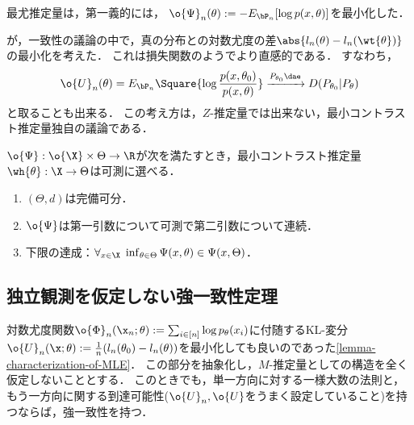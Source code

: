 \documentclass[uplatex,dvipdfmx]{jsreport}
\begin{document}
\begin{example}[最尤推定]
    最尤推定量は，第一義的には，
    $\o{\Psi}_n(\theta):=-E_{\bP_n} [\log p(x,\theta)]$を最小化した．
    
    が，一致性の議論の中で，真の分布との対数尤度の差$\abs{l_n(\theta)-l_n(\wt{\theta})}$の最小化を考えた．
    これは損失関数のようでより直感的である．
    すなわち，
    \[\o{U}_n(\theta)=E_{\bP_n} \Square{\log\frac{ p(x,\theta_0)}{p(x,\theta)}}\xrightarrow{P_{\theta_0}\dae}D(P_{\theta_0}|P_\theta)\]
    と取ることも出来る．
    この考え方は，$Z$-推定量では出来ない，最小コントラスト推定量独自の議論である．
\end{example}

\begin{theorem}\label{thm-measurable-selection}
    $\o{\Psi}:\o{\X}\times\Theta\to\R$が次を満たすとき，最小コントラスト推定量$\wh{\theta}:\X\to\Theta$は可測に選べる．
    \begin{enumerate}
        \item $(\Theta,d)$は完備可分．
        \item $\o{\Psi}$は第一引数について可測で第二引数について連続．
        \item 下限の達成：$\forall_{x\in\X}\;\inf_{\theta\in\Theta}\Psi(x,\theta)\in\Psi(x,\Theta)$．
    \end{enumerate}
\end{theorem}

\subsection{独立観測を仮定しない強一致性定理}

\begin{tcolorbox}[colframe=ForestGreen, colback=ForestGreen!10!white,breakable,colbacktitle=ForestGreen!40!white,coltitle=black,fonttitle=\bfseries\sffamily,
title=]
    対数尤度関数$\o{\Phi}_n(\x_n;\theta):=\sum_{i\in[n]}\log p_\theta(x_i)$に付随するKL-変分$\o{U}_n(\x;\theta):=\frac{1}{n}(l_n(\theta_0)-l_n(\theta))$を最小化しても良いのであった\ref{lemma-characterization-of-MLE}．
    この部分を抽象化し，$M$-推定量としての構造を全く仮定しないこととする．
    このときでも，単一方向に対する一様大数の法則と，もう一方向に関する到達可能性($\o{U}_n,\o{U}$をうまく設定していること)を持つならば，強一致性を持つ．
\end{tcolorbox}
\end{document}
